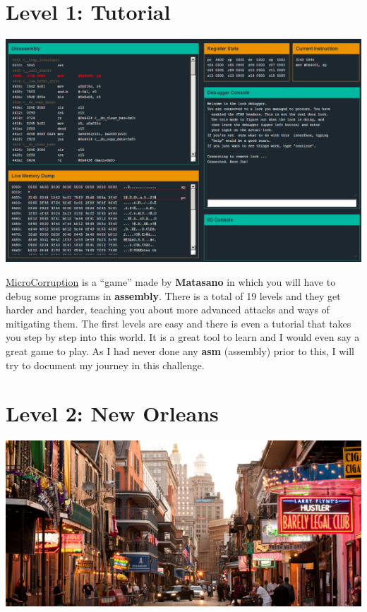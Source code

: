 \section{Level 1: Tutorial}\label{level-1-tutorial}

\includegraphics{img/1_1.png}

\href{http://microcorruption.com/}{MicroCorruption} is a ``game'' made
by \textbf{Matasano} in which you will have to debug some programs in
\textbf{assembly}. There is a total of 19 levels and they get harder and
harder, teaching you about more advanced attacks and ways of mitigating
them. The first levels are easy and there is even a tutorial that takes
you step by step into this world. It is a great tool to learn and I
would even say a great game to play. As I had never done any
\textbf{asm} (assembly) prior to this, I will try to document my journey
in this challenge.

\section{Level 2: New Orleans}\label{level-2-new-orleans}

\includegraphics{img/2_3.png}

